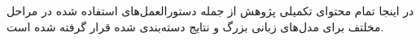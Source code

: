 
در اینجا تمام محتوای تکمیلی پژوهش از جمله دستورالعمل‌های استفاده شده در مراحل مخلتف برای مدل‌های زبانی بزرگ و نتایج دسته‌بندی شده قرار گرفته شده است.



